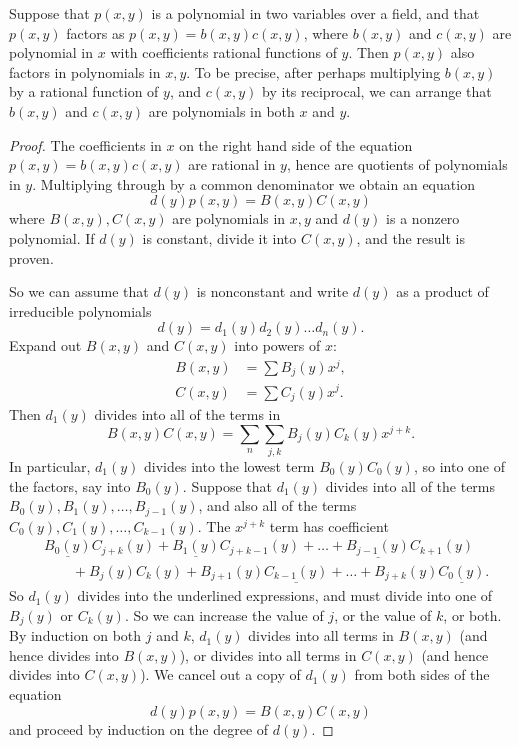 \begin{proposition}\label{proposition:Gauss.lemma}
Suppose that \(p(x,y)\) is a polynomial in two variables over a field, and that \(p(x,y)\) factors as \(p(x,y)=b(x,y)c(x,y)\), where \(b(x,y)\) and \(c(x,y)\) are polynomial in \(x\) with coefficients rational functions of \(y\).
Then \(p(x,y)\) also factors in polynomials in \(x,y\).
To be precise, after perhaps multiplying \(b(x,y)\) by a rational function of \(y\), and \(c(x,y)\) by its reciprocal, we can arrange that \(b(x,y)\) and \(c(x,y)\) are polynomials in both \(x\) and \(y\).
\end{proposition}
\begin{proof}
The coefficients in \(x\) on the right hand side of the equation
\(p(x,y) = b(x,y)c(x,y)\) are rational in \(y\), hence are quotients of polynomials in \(y\). Multiplying through by a common denominator we obtain an equation 
\[
d(y)p(x,y) = B(x,y)C(x,y)
\]
where \(B(x,y), C(x,y)\) are polynomials in \(x,y\) and \(d(y)\) is a nonzero polynomial. 
If \(d(y)\) is constant, divide it into \(C(x,y)\), and the result is proven.

So we can assume that \(d(y)\) is nonconstant and write \(d(y)\) as a product of irreducible polynomials
\[
d(y) = d_1(y)d_2(y) \dots d_n(y).
\]
Expand out \(B(x,y)\) and \(C(x,y)\) into powers of \(x\):
\begin{align*}
B(x,y) &= \sum B_j(y)x^j, \\
C(x,y) &= \sum C_j(y)x^j.
\end{align*}
Then \(d_1(y)\) divides into all of the terms in 
\[
B(x,y)C(x,y)= \sum_n \sum_{j,k} B_j(y)C_k(y) x^{j+k}.
\]
In particular, \(d_1(y)\) divides into the lowest term \(B_0(y)C_0(y)\), so into one of the factors, say into \(B_0(y)\).
Suppose that \(d_1(y)\) divides into all of the terms \(B_0(y), B_1(y), \dots, B_{j-1}(y)\), and also all of the terms \(C_0(y), C_1(y), \dots, C_{k-1}(y)\).
The \(x^{j+k}\) term has coefficient
\begin{align*}
& \underline{B_0(y)} C_{j+k}(y) + \underline{B_1(y)} C_{j+k-1}(y) + \dots + \underline{B_{j-1}(y)} C_{k+1}(y) \\
& \qquad + B_j(y) C_k(y) + B_{j+1}(y) \underline{C_{k-1}(y)} + \dots + B_{j+k}(y) \underline{C_0(y)}.
\end{align*}
So \(d_1(y)\) divides into the underlined expressions, and must divide into one of \(B_j(y)\) or \(C_k(y)\).
So we can increase the value of \(j\), or the value of \(k\), or both.
By induction on both \(j\) and \(k\), \(d_1(y)\) divides into all terms in \(B(x,y)\) (and hence divides into \(B(x,y)\)), or divides into all terms in \(C(x,y)\) (and hence divides into \(C(x,y)\)).
We cancel out a copy of \(d_1(y)\) from both sides of the equation
\[
d(y)p(x,y) = B(x,y)C(x,y)
\]
and proceed by induction on the degree of \(d(y)\).
\end{proof}


